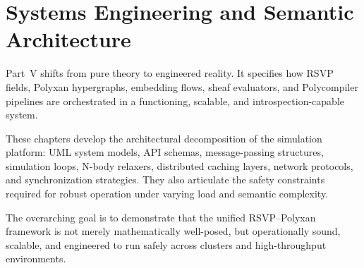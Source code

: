 \part{Systems Engineering and Semantic Architecture}

Part~V shifts from pure theory to engineered reality. It specifies how
RSVP fields, Polyxan hypergraphs, embedding flows, sheaf evaluators,
and Polycompiler pipelines are orchestrated in a functioning, scalable,
and introspection-capable system.

These chapters develop the architectural decomposition of the simulation
platform: UML system models, API schemas, message-passing structures,
simulation loops, N-body relaxers, distributed caching layers, network
protocols, and synchronization strategies. They also articulate the
safety constraints required for robust operation under varying load and
semantic complexity.

The overarching goal is to demonstrate that the unified RSVP--Polyxan
framework is not merely mathematically well-posed, but operationally
sound, scalable, and engineered to run safely across clusters and
high-throughput environments.

\cleardoublepage
